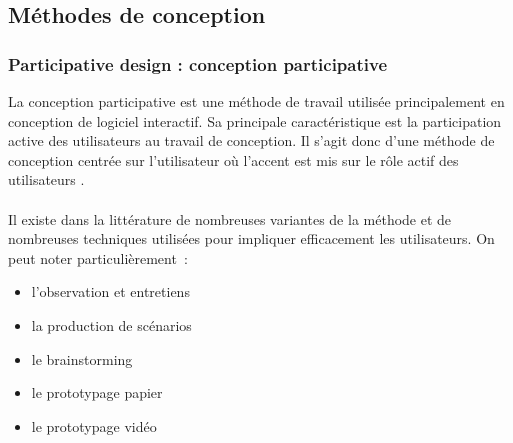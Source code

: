	\newpage
	\subsection{Méthodes de conception}
		\subsubsection{Participative design : conception participative}
La conception participative est une méthode de travail utilisée principalement en conception de logiciel interactif. Sa principale caractéristique est la participation active des utilisateurs au travail de conception. Il s'agit donc d'une méthode de conception centrée sur l'utilisateur où l'accent est mis sur le rôle actif des utilisateurs \cite{wiki:cp}.

\paragraph{}
Il existe dans la littérature de nombreuses variantes de la méthode et de nombreuses techniques utilisées pour impliquer efficacement les utilisateurs. On peut noter particulièrement~:
\begin{itemize}
    \item l'observation et entretiens
    \item la production de scénarios
    \item le brainstorming
    \item le prototypage papier
    \item le prototypage vidéo
\end{itemize}


